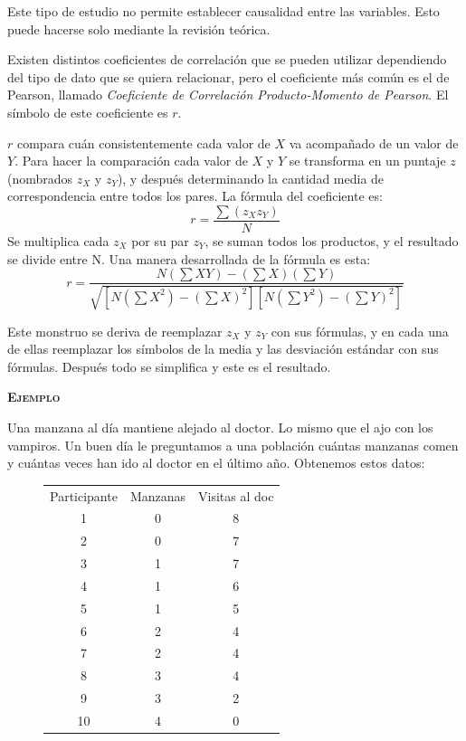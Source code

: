 \documentclass[a4paper,12pt]{article}
\begin{document}
Este tipo de estudio no permite establecer causalidad entre las variables. Esto puede hacerse solo mediante la revisión teórica.

Existen distintos coeficientes de correlación que se pueden utilizar dependiendo del tipo de dato que se quiera relacionar, pero el coeficiente más común es el de Pearson, llamado {\slshape Coeficiente de Correlación Producto-Momento de Pearson}. El símbolo de este coeficiente es $r$.

$r$ compara cuán consistentemente cada valor de $X$ va acompañado de un valor de $Y$. Para hacer la comparación cada valor de $X$ y $Y$ se transforma en un puntaje $z$ (nombrados $z_X$ y $z_Y$), y después determinando la cantidad media de correspondencia entre todos los pares. La fórmula del coeficiente es:
\[
  r = \frac{
    \sum(z_X z_Y)
  }{
    N
  }
\]
Se multiplica cada $z_X$ por su par $z_Y$, se suman todos los productos, y el resultado se divide entre N. Una manera desarrollada de la fórmula es esta:
\[
  r = \frac{
    N(\sum XY) - (\sum X)(\sum Y)
  }{
    \sqrt{\left[N\left(\sum X^{2}\right) - \left(\sum X\right)^{2}\right] \left[N\left(\sum Y^{2}\right) - \left(\sum Y\right)^{2}\right]}
  }
\]

Este monstruo se deriva de reemplazar $z_X$ y $z_Y$ con sus fórmulas, y en cada una de ellas reemplazar los símbolos de la media y las desviación estándar con sus fórmulas. Después todo se simplifica y este es el resultado.

{\noindent\scshape\bfseries Ejemplo}

Una manzana al día mantiene alejado al doctor. Lo mismo que el ajo con los vampiros. Un buen día le preguntamos a una población cuántas manzanas comen y cuántas veces han ido al doctor en el último año. Obtenemos estos datos:
\begin{figure}[!ht]
  \begin{center}
    \begin{tabular}{c|c|c}
      Participante&Manzanas&Visitas al doc\\
      1&0&8\\
      2&0&7\\
      3&1&7\\
      4&1&6\\
      5&1&5\\
      6&2&4\\
      7&2&4\\
      8&3&4\\
      9&3&2\\
      10&4&0
    \end{tabular}
  \end{center}
\end{figure}
\end{document}

